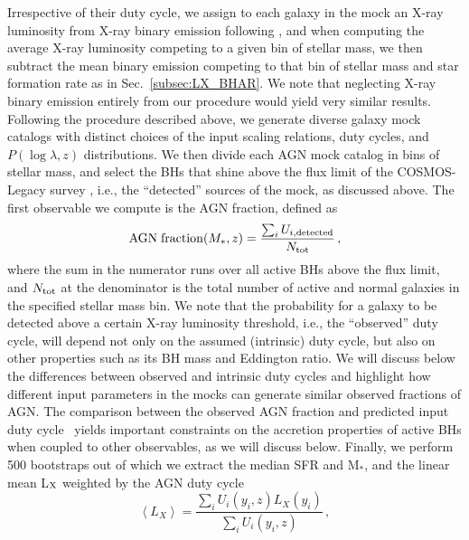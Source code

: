 Irrespective of their duty cycle, we assign to each galaxy in the mock an X-ray luminosity
from X-ray binary emission following \citet[][Table 3]{2016ApJ...825....7L}, and
when computing the average X-ray luminosity competing to a given bin of stellar mass, we then
subtract the mean binary emission competing to that bin of stellar mass and star formation rate
as in Sec.~\ref{subsec:LX_BHAR}.
We note that neglecting X-ray binary emission entirely from our procedure would yield very
similar results.
Following the procedure described above, we generate diverse galaxy mock catalogs with
distinct choices of the input \MBHMS{} scaling relations, duty cycles, and $P(\log\lambda,z)$
distributions. 
We then divide each AGN mock catalog in bins of stellar mass, and select the
BHs that shine above the flux limit of the COSMOS-Legacy survey \citep{2016ApJ...817...34M},
i.e., the ``detected'' sources of the mock, as discussed above. The first observable we
compute is the AGN fraction, defined as
\begin{equation}
{\rm AGN\;fraction}(M_*,z)=\frac{\sum_i U_{i,{\rm detected}}} {N_{\rm tot}}\, ,
    \label{eq:AGN_fraction}
\end{equation}
where the sum in the numerator runs over all active BHs above the flux limit, and $N_{\rm tot}$
at the denominator is the total number of active and normal galaxies in
the specified stellar mass bin. We note that the probability for a galaxy to be detected above
a certain X-ray luminosity threshold, i.e., the ``observed'' duty cycle, will depend not only
on the assumed (intrinsic) duty cycle, but also on other properties such as its BH mass and
Eddington ratio. We will discuss below the differences between observed and intrinsic duty
cycles and highlight how different input parameters in the mocks can generate similar observed
fractions of AGN.
The comparison between the observed AGN fraction and predicted input duty cycle \UMBHz\ yields important constraints on the accretion properties of active BHs when coupled to other observables, as we will discuss below.
Finally, we perform 500 bootstraps out of which we extract the median SFR and M$_*$, and the linear mean L$_{\rm X}$ weighted by the AGN duty cycle %
\begin{equation}
\left<L_X\right>=\frac{\sum_i U_i(y_i,z) L_X(y_i)} {\sum_i U_i(y_i,z)}\, ,
    \label{eq:meanLx}
\end{equation}
